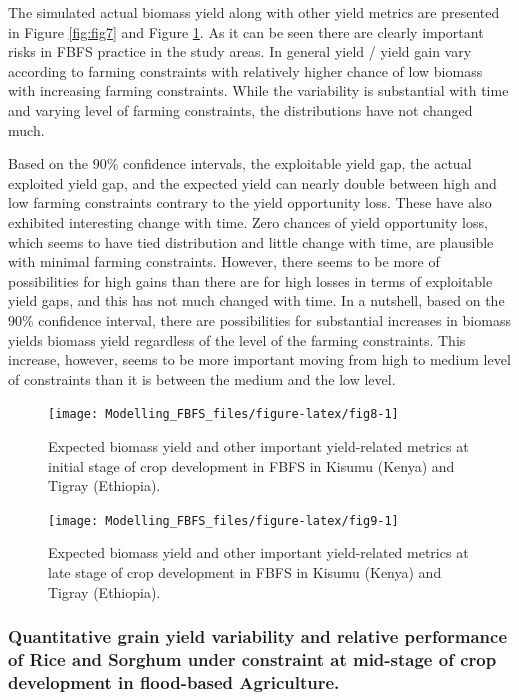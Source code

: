 \documentclass[12pt,oneside]{article}
\begin{document}
The simulated actual biomass yield along with other yield metrics are presented in Figure \ref{fig:fig7} and Figure \ref{fig:fig8}. As it can be seen there are clearly important risks in FBFS practice in the study areas. In general yield / yield gain vary according to farming constraints with relatively higher chance of low biomass with increasing farming constraints. While the variability is substantial with time and varying level of farming constraints, the distributions have not changed much.

Based on the 90\% confidence intervals, the exploitable yield gap, the actual exploited yield gap, and the expected yield can nearly double between high and low farming constraints contrary to the yield opportunity loss. These have also exhibited interesting change with time. Zero chances of yield opportunity loss, which seems to have tied distribution and little change with time, are plausible with minimal farming constraints. However, there seems to be more of possibilities for high gains than there are for high losses in terms of exploitable yield gaps, and this has not much changed with time. In a nutshell, based on the 90\% confidence interval, there are possibilities for substantial increases in biomass yields biomass yield regardless of the level of the farming constraints. This increase, however, seems to be more important moving from high to medium level of constraints than it is between the medium and the low level.

\begin{figure}[!htbp]

{\centering \texttt{[image: Modelling\_FBFS\_files/figure-latex/fig8-1]} 

}

\caption{Expected biomass yield and other important yield-related metrics at initial stage of crop development in FBFS in Kisumu (Kenya) and Tigray (Ethiopia).}\label{fig:fig8}
\end{figure}

\begin{figure}[!htbp]

{\centering \texttt{[image: Modelling\_FBFS\_files/figure-latex/fig9-1]} 

}

\caption{Expected biomass yield and other important yield-related metrics at late stage of crop development in FBFS in Kisumu (Kenya) and Tigray (Ethiopia).}\label{fig:fig9}
\end{figure}

\hypertarget{IV23}{%
\subsubsection{Quantitative grain yield variability and relative performance of Rice and Sorghum under constraint at mid-stage of crop development in flood-based Agriculture.}\label{IV23}}
\end{document}
